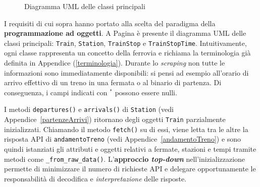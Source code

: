 \documentclass[12pt,italian]{report}
\begin{document}
{\begin{landscape}
\begin{figure}[h]
            \caption{Diagramma UML delle classi principali}
            \vfill
        \end{figure}
    \end{landscape}
    \restoregeometry }

I requisiti di cui sopra hanno portato alla scelta del paradigma della
\textbf{programmazione ad oggetti}.  A Pagina \pageref{uml_classi} è
presente il diagramma UML delle classi principali: \texttt{Train},
\texttt{Station}, \texttt{TrainStop} e \texttt{TrainStopTime}.
Intuitivamente, ogni classe rappresenta un concetto della ferrovia e
richiama la terminologia già definita in Appendice
(\ref{terminologia}).  Durante lo \textit{scraping} non tutte le
informazioni sono immediatamente disponibili: si pensi ad esempio
all'orario di arrivo effettivo di un treno in una fermata o al binario
di partenza.  Di conseguenza, i campi indicati con $^*$ possono essere
nulli.

I metodi \texttt{departures()} e \texttt{arrivals()} di
\texttt{Station} (vedi Appendice~\ref{partenzeArrivi}) ritornano degli
oggetti \texttt{Train} parzialmente inizializzati.  Chiamando il
metodo \texttt{fetch()} su di essi, viene letta tra le altre la
risposta API di \texttt{andamentoTreno} (vedi
Appendice~\ref{andamentoTreno}) e sono quindi istanziati gli attributi
e oggetti relativi a fermate, stazioni e tempi tramite metodi come
\texttt{\_from\_raw\_data()}.  L'\textbf{approccio \textit{top-down}}
nell'inizializzazione permette di minimizzare il numero di richieste
API e delegare opportunamente le responsabilità di decodifica e
\textit{interpretazione} delle risposte.
\end{document}

